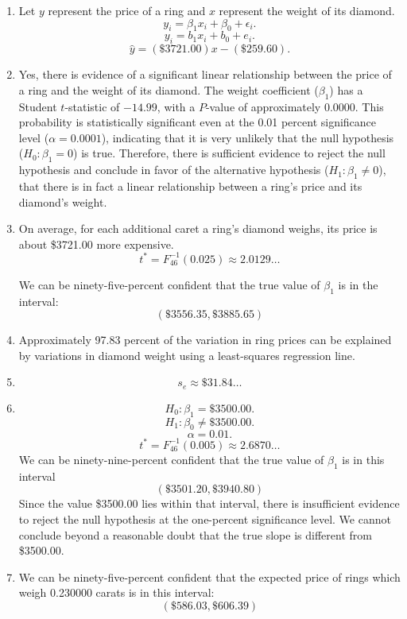 \documentclass[12pt]{article}
\begin{document}
\begin{enumerate}
\begin{figure}
\end{figure}
\item Let $y$ represent the price of a ring and $x$ represent the weight of its diamond. \[y_i=\beta_1x_i+\beta_0+\epsilon_i.\]
\[y_i=b_1x_i+b_0+e_i.\]
\[\hat{y}=(\$3721.00)x-(\$259.60).\]
\item Yes, there is evidence of a significant linear relationship between the price of a ring and the weight of its diamond. The weight coefficient ($\beta_1$) has a Student $t$-statistic of $-14.99$, with a $P$-value of approximately 0.0000. This probability is statistically significant even at the 0.01 percent significance level ($\alpha=0.0001$), indicating that it is very unlikely that the null hypothesis ($H_0:\beta_1=0$) is true. Therefore, there is sufficient evidence to reject the null hypothesis and conclude in favor of the alternative hypothesis ($H_1:\beta_1\neq 0$), that there is in fact a linear relationship between a ring's price and its diamond's weight.
\item On average, for each additional caret a ring's diamond weighs, its price is about \$3721.00 more expensive.
\[t^*=F^{-1}_{46}(0.025)\approx 2.0129\dots\]

We can be ninety-five-percent confident that the true value of $\beta_1$ is in the interval:
\[(\$3556.35,\$3885.65)\]
\item Approximately 97.83 percent of the variation in ring prices can be explained by variations in diamond weight using a least-squares regression line.
\item\[s_e\approx\$31.84\dots\]
\item\[H_0:\beta_1=\$3500.00.\]
\[H_1:\beta_0\neq\$3500.00.\]
\[\alpha=0.01.\]
\[t^*=F^{-1}_{46}(0.005)\approx 2.6870\dots\]
We can be ninety-nine-percent confident that the true value of $\beta_1$ is in this interval
\[(\$3501.20,\$3940.80)\]
Since the value \$3500.00 lies within that interval, there is insufficient evidence to reject the null hypothesis at the one-percent significance level. We cannot conclude beyond a reasonable doubt that the true slope is different from \$3500.00.
\item We can be ninety-five-percent confident that the expected price of rings which weigh 0.230000 carats is in this interval:
\[(\$586.03,\$606.39)\]
\end{enumerate}
\end{document}
